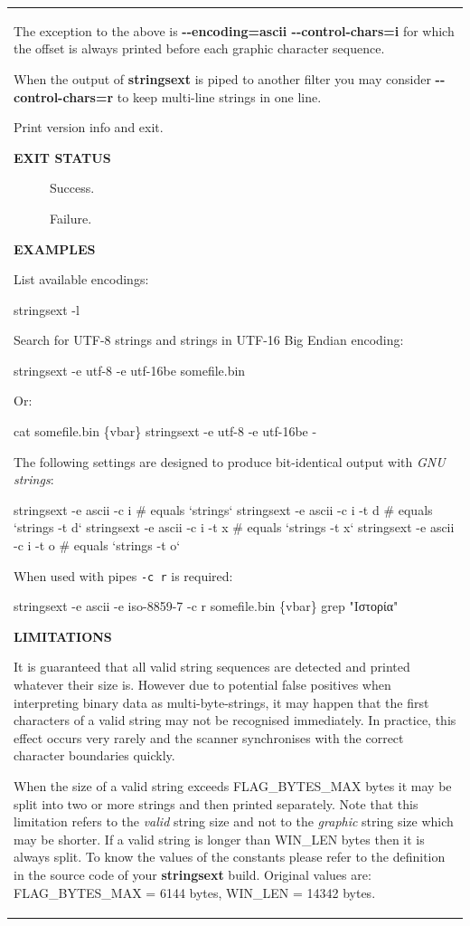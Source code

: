 \begin{longtable}[]{@{}l@{}}
\begin{minipage}[t]{0.97\columnwidth}
\begin{description}
The exception to the above is \textbf{-\/-encoding=ascii
-\/-control-chars=i} for which the offset is always printed before each
graphic character sequence.

When the output of \textbf{stringsext} is piped to another filter you
may consider \textbf{-\/-control-chars=r} to keep multi-line strings in
one line.
\item[\textbf{-V, -\/-version}]
Print version info and exit.
\end{description}

\textbf{EXIT STATUS}

\begin{description}
\item[\textbf{0}]
Success.
\item[\textbf{other values}]
Failure.
\end{description}

\textbf{EXAMPLES}

List available encodings:

stringsext -l

Search for UTF-8 strings and strings in UTF-16 Big Endian encoding:

stringsext -e utf-8 -e utf-16be somefile.bin

Or:

cat somefile.bin \{vbar\} stringsext -e utf-8 -e utf-16be -

The following settings are designed to produce bit-identical output with
\emph{GNU strings}:

stringsext -e ascii -c i \# equals `strings` stringsext -e ascii -c i -t
d \# equals `strings -t d` stringsext -e ascii -c i -t x \# equals
`strings -t x` stringsext -e ascii -c i -t o \# equals `strings -t o`

When used with pipes \texttt{-c\ r} is required:

stringsext -e ascii -e iso-8859-7 -c r somefile.bin \{vbar\} grep
"Ιστορία"

\textbf{LIMITATIONS}

It is guaranteed that all valid string sequences are detected and
printed whatever their size is. However due to potential false positives
when interpreting binary data as multi-byte-strings, it may happen that
the first characters of a valid string may not be recognised
immediately. In practice, this effect occurs very rarely and the scanner
synchronises with the correct character boundaries quickly.

When the size of a valid string exceeds FLAG\_BYTES\_MAX bytes it may be
split into two or more strings and then printed separately. Note that
this limitation refers to the \emph{valid} string size and not to the
\emph{graphic} string size which may be shorter. If a valid string is
longer than WIN\_LEN bytes then it is always split. To know the values
of the constants please refer to the definition in the source code of
your \textbf{stringsext} build. Original values are: FLAG\_BYTES\_MAX =
6144 bytes, WIN\_LEN = 14342 bytes.


\end{minipage}
\end{longtable}
